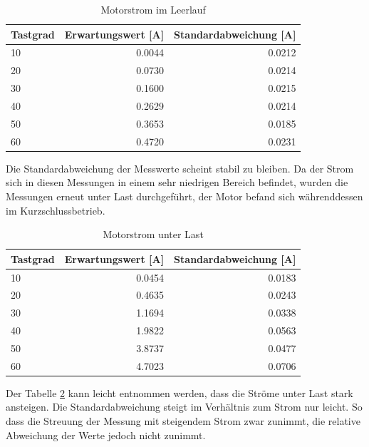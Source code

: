 \begin{table}[H]
  \centering
  \begin{tabularx}{\textwidth}{|X|r|r|}
    \hline
    Tastgrad & Erwartungswert [\si{\A}] & Standardabweichung [\si{\A}]  \\ \hline \hline
    10 & \num{0,0044} & \num{0,0212}\\ \hline
    20 & \num{0,0730} & \num{0,0214}\\ \hline
    30 & \num{0,1600} & \num{0,0215}\\ \hline
    40 & \num{0,2629} & \num{0,0214}\\ \hline
    50 & \num{0,3653} & \num{0,0185}\\ \hline
    60 & \num{0,4720} & \num{0,0231}\\ \hline

  \end{tabularx}
  \caption{Motorstrom im Leerlauf}%
  \label{tab:current_noload}
\end{table}

Die Standardabweichung der Messwerte scheint stabil zu bleiben. Da der Strom sich in diesen Messungen in einem sehr niedrigen Bereich befindet, wurden
die Messungen erneut unter Last durchgeführt, der Motor befand sich währenddessen im Kurzschlussbetrieb.

\begin{table}[H]
  \centering
  \begin{tabularx}{\textwidth}{|X|r|r|}
    \hline
    Tastgrad & Erwartungswert [\si{\A}] & Standardabweichung [\si{\A}]  \\ \hline \hline
    10 & \num{0,0454} & \num{0,0183}\\ \hline
    20 & \num{0,4635} & \num{0,0243}\\ \hline
    30 & \num{1,1694} & \num{0,0338}\\ \hline
    40 & \num{1,9822} & \num{0,0563}\\ \hline
    50 & \num{3,8737} & \num{0,0477}\\ \hline
    60 & \num{4,7023} & \num{0,0706}\\ \hline
  \end{tabularx}
  \caption{Motorstrom unter Last}%
  \label{tab:current_load}
\end{table}

Der Tabelle \ref{tab:current_load} kann leicht entnommen werden, dass die Ströme unter Last stark ansteigen. Die Standardabweichung steigt im Verhältnis zum Strom nur leicht.
So dass die Streuung der Messung mit steigendem Strom zwar zunimmt, die relative Abweichung der Werte jedoch nicht zunimmt.


